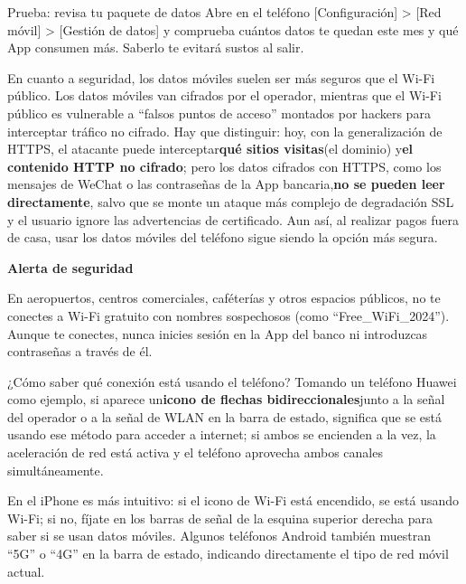 \begin{tcbpractice}{Prueba: revisa tu paquete de datos}
Abre en el teléfono [Configuración] > [Red móvil] > [Gestión de datos] y comprueba cuántos datos te quedan este mes y qué App consumen más. Saberlo te evitará sustos al salir.

\end{tcbpractice}


En cuanto a seguridad, los datos móviles suelen ser más seguros que el Wi-Fi público. Los datos móviles van cifrados por el operador, mientras que el Wi-Fi público es vulnerable a “falsos puntos de acceso” montados por hackers para interceptar tráfico no cifrado. Hay que distinguir: hoy, con la generalización de HTTPS, el atacante puede interceptar\textbf{qué sitios visitas}(el dominio) y\textbf{el contenido HTTP no cifrado}; pero los datos cifrados con HTTPS, como los mensajes de WeChat o las contraseñas de la App bancaria,\textbf{no se pueden leer directamente}, salvo que se monte un ataque más complejo de degradación SSL y el usuario ignore las advertencias de certificado. Aun así, al realizar pagos fuera de casa, usar los datos móviles del teléfono sigue siendo la opción más segura.

\textbf{Alerta de seguridad}\par

En aeropuertos, centros comerciales, caféterías y otros espacios públicos, no te conectes a Wi-Fi gratuito con nombres sospechosos (como “Free\_WiFi\_2024”). Aunque te conectes, nunca inicies sesión en la App del banco ni introduzcas contraseñas a través de él.


¿Cómo saber qué conexión está usando el teléfono? Tomando un teléfono Huawei como ejemplo, si aparece un\textbf{icono de flechas bidireccionales}junto a la señal del operador o a la señal de WLAN en la barra de estado, significa que se está usando ese método para acceder a internet; si ambos se encienden a la vez, la aceleración de red está activa y el teléfono aprovecha ambos canales simultáneamente.

En el iPhone es más intuitivo: si el icono de Wi-Fi está encendido, se está usando Wi-Fi; si no, fíjate en los barras de señal de la esquina superior derecha para saber si se usan datos móviles. Algunos teléfonos Android también muestran “5G” o “4G” en la barra de estado, indicando directamente el tipo de red móvil actual.

